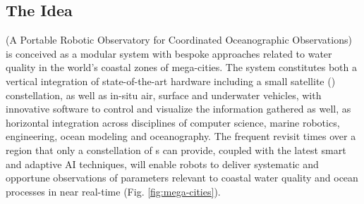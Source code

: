 \subsection{The Idea}



\pro (A Portable Robotic Observatory for Coordinated Oceanographic
Observations) is conceived as a modular system with bespoke approaches
related to water quality in the world’s coastal zones of mega-cities.
The system constitutes both a vertical integration of state-of-the-art
hardware including a small satellite (\smle) constellation, as well as
in-situ air, surface and underwater vehicles, with innovative software
to control and visualize the information gathered as well, as
horizontal integration across disciplines of computer science, marine
robotics, engineering, ocean modeling and oceanography. The frequent
revisit times over a region that only a constellation of \smle s can
provide, coupled with the latest smart and adaptive AI techniques,
will enable robots to deliver systematic and opportune observations of
parameters relevant to coastal water quality and ocean processes in
near real-time (Fig. \ref{fig:mega-cities}).



